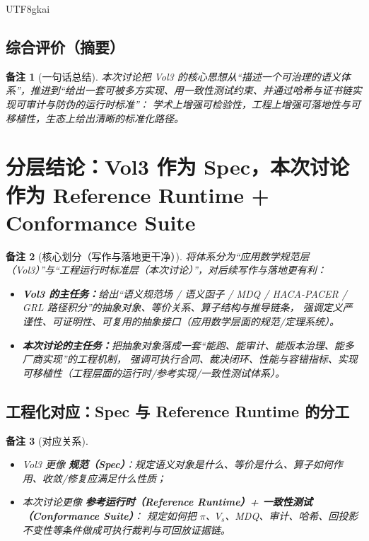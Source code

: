 \documentclass[12pt]{article}
\newtheorem{remark}{备注}[section]
\begin{document}
\begin{CJK*}{UTF8}{gkai}
\subsection{综合评价（摘要）}
\label{subsec:vol3-summary}

\begin{remark}[一句话总结]
本次讨论把 Vol3 的核心思想从“描述一个可治理的语义体系”，推进到“给出一套可被多方实现、用一致性测试约束、并通过哈希与证书链实现可审计与防伪的运行时标准”：
学术上增强可检验性，工程上增强可落地性与可移植性，生态上给出清晰的标准化路径。
\end{remark}

\clearpage

\section{分层结论：Vol3 作为 Spec，本次讨论作为 Reference Runtime + Conformance Suite}
\label{sec:spec-vs-runtime-layering}

\begin{remark}[核心划分（写作与落地更干净）]
将体系分为“应用数学规范层（Vol3）”与“工程运行时标准层（本次讨论）”，对后续写作与落地更有利：
\begin{itemize}
  \item \textbf{Vol3 的主任务：}给出“语义规范场 / 语义函子 / MDQ / HACA-PACER / GRL 路径积分”的抽象对象、等价关系、算子结构与推导链条，
  强调定义严谨性、可证明性、可复用的抽象接口（应用数学层面的规范/定理系统）。
  \item \textbf{本次讨论的主任务：}把抽象对象落成一套“能跑、能审计、能版本治理、能多厂商实现”的工程机制，
  强调可执行合同、裁决闭环、性能与容错指标、实现可移植性（工程层面的运行时/参考实现/一致性测试体系）。
\end{itemize}
\end{remark}

\subsection{工程化对应：Spec 与 Reference Runtime 的分工}
\label{subsec:spec-runtime-roles}

\begin{remark}[对应关系]
\begin{itemize}
  \item Vol3 更像 \textbf{规范（Spec）}：规定语义对象是什么、等价是什么、算子如何作用、收敛/修复应满足什么性质；
  \item 本次讨论更像 \textbf{参考运行时（Reference Runtime）+ 一致性测试（Conformance Suite）}：
  规定如何把 $\pi$、$V_s$、MDQ、审计、哈希、回投影不变性等条件做成可执行裁判与可回放证据链。
\end{itemize}
\end{remark}


\end{CJK*}
\end{document}
